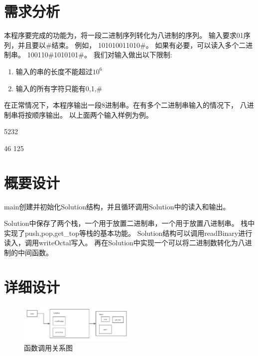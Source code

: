 \section{需求分析}

本程序要完成的功能为，将一段二进制序列转化为八进制的序列。
输入要求01序列，并且要以\#结束。
例如，
101010011010\#。
如果有必要，可以读入多个二进制串。
100110\#1010101\#。
我们对输入做出以下限制:
\begin{enumerate}
   \item 输入的串的长度不能超过$10^6$
   \item 输入的所有字符只能有0,1,\#
\end{enumerate}


在正常情况下，本程序输出一段8进制串。在有多个二进制串输入的情况下，
八进制串将按顺序输出。
以上面两个输入样例为例。


5232


46 125



\section{概要设计}
   main创建并初始化Solution结构，并且循环调用Solution中的读入和输出。


   Solution中保存了两个栈，一个用于放置二进制串，一个用于放置八进制串。
   栈中实现了push,pop,get\_top等栈的基本功能。
   Solution结构可以调用readBinary进行读入，调用writeOctal写入。
   再在Solution中实现一个可以将二进制数转化为八进制的中间函数。

\section{详细设计}

\begin{figure}[H]
   \centering
   \includegraphics[width=0.5\textwidth]{images/process.png}
   \caption{函数调用关系图}
\end{figure}

\newpage

